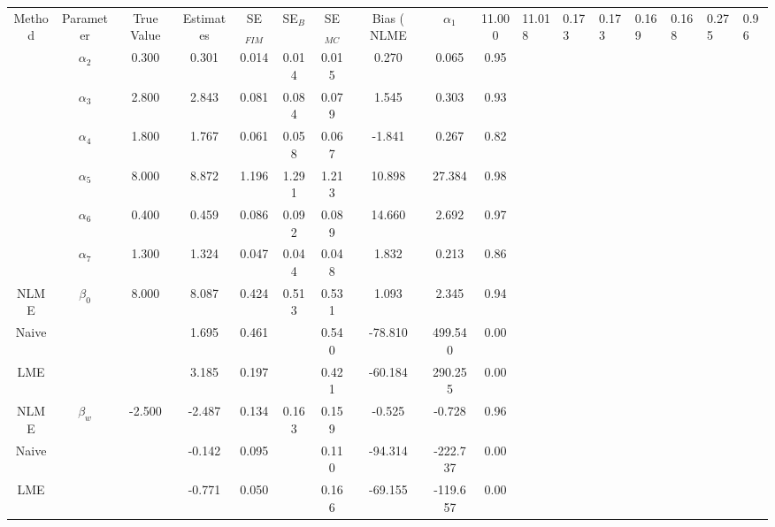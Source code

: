 \begin{table}[ht]
\centering
\begin{tabular}{cccccccccc}
  \hline
Method & Parameter & True Value & Estimates & SE$_{FIM}$ & SE$_{B}$ & SE$_{MC}$ & Bias (%
  \hline
NLME & $\alpha_1$ & 11.000 & 11.018 & 0.173 & 0.173 & 0.169 & 0.168 & 0.275 & 0.96 \\ 
   & $\alpha_2$ & 0.300 & 0.301 & 0.014 & 0.014 & 0.015 & 0.270 & 0.065 & 0.95 \\ 
   & $\alpha_3$ & 2.800 & 2.843 & 0.081 & 0.084 & 0.079 & 1.545 & 0.303 & 0.93 \\ 
   & $\alpha_4$ & 1.800 & 1.767 & 0.061 & 0.058 & 0.067 & -1.841 & 0.267 & 0.82 \\ 
   & $\alpha_5$ & 8.000 & 8.872 & 1.196 & 1.291 & 1.213 & 10.898 & 27.384 & 0.98 \\ 
   & $\alpha_6$ & 0.400 & 0.459 & 0.086 & 0.092 & 0.089 & 14.660 & 2.692 & 0.97 \\ 
   & $\alpha_7$ & 1.300 & 1.324 & 0.047 & 0.044 & 0.048 & 1.832 & 0.213 & 0.86 \\ 
   \hline
NLME & $\beta_0$ & 8.000 & 8.087 & 0.424 & 0.513 & 0.531 & 1.093 & 2.345 & 0.94 \\ 
  Naive &  &  & 1.695 & 0.461 &  & 0.540 & -78.810 & 499.540 & 0.00 \\ 
  LME &  &  & 3.185 & 0.197 &  & 0.421 & -60.184 & 290.255 & 0.00 \\ 
  NLME & $\beta_w$ & -2.500 & -2.487 & 0.134 & 0.163 & 0.159 & -0.525 & -0.728 & 0.96 \\ 
  Naive &  &  & -0.142 & 0.095 &  & 0.110 & -94.314 & -222.737 & 0.00 \\ 
  LME &  &  & -0.771 & 0.050 &  & 0.166 & -69.155 & -119.657 & 0.00 \\ 
   \hline
\end{tabular}
\end{table}
